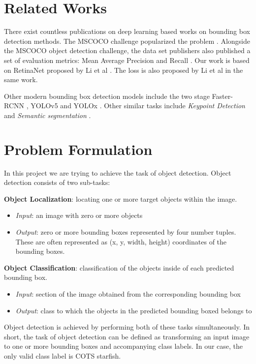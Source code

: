 \documentclass{article}
\begin{document}
\section{Related Works}
There exist countless publications on deep learning based works on bounding box detection methods.
The MSCOCO challenge popularized the problem \cite{coco}.
Alongside the MSCOCO object detection challenge, the data set publishers also published a set of evaluation metrics: Mean Average Precision and Recall \cite{coco}.
Our work is based on RetinaNet proposed by Li et al \cite{retinanet}.
The loss is also proposed by Li et al in the same work.

Other modern bounding box detection models include the two stage Faster-RCNN \cite{rcnn}, YOLOv5 \cite{yolov4} and YOLOx \cite{yolox}.
Other similar tasks include \textit{Keypoint Detection} and \textit{Semantic segmentation} \cite{9356353}.

\section{Problem Formulation}
In this project we are trying to achieve the task of object detection. 
Object detection consists of two sub-tasks: 

\textbf{Object Localization}: locating one or more target objects within the image.
\begin{itemize}
    \item \textit{Input}: an image with zero or more objects
    \item \textit{Output}: zero or more bounding boxes represented by four number tuples.  These are often represented as (x, y, width, height) coordinates of the bounding boxes.
\end{itemize}

\textbf{Object Classification}: classification of the objects inside of each predicted bounding box.
\begin{itemize}
    \item \textit{Input}: section of the image obtained from the corresponding bounding box
    \item \textit{Output}: class to which the objects in the predicted bounding boxed belongs to
\end{itemize}

Object detection is achieved by performing both of these tasks simultaneously.
In short, the task of object detection can be defined as transforming an input image to one or more bounding boxes and accompanying class labels.
In our case, the only valid class label is COTS starfish.
\end{document}
